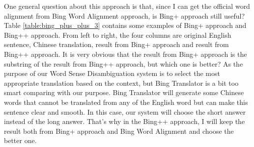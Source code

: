 \begin{CJK}{UTF8}{gbsn}
One general question about this approach is that, since I can get the official word alignment from Bing Word Alignment approach, is Bing+ approach still useful? Table \ref{table:bing_plus_plus_3} contains some examples of Bing+ approach and Bing++ approach. From left to right, the four columns are original English sentence, Chinese translation, result from Bing+ approach and result from Bing++ approach. It is very obvious that the result from Bing+ approach is the substring of the result from Bing++ approach, but which one is better? As the purpose of our Word Sense Disambiguation system is to select the most appropriate translation based on the context, but Bing Translator is a bit too smart comparing with our purpose. Bing Translator will generate some Chinese words that cannot be translated from any of the English word but can make this sentence clear and smooth. In this case, our system will choose the short answer instead of the long answer. That's why in the Bing++ approach, I will keep the result both from Bing+ approach and Bing Word Alignment and choose the better one.
\\


\end{CJK}
